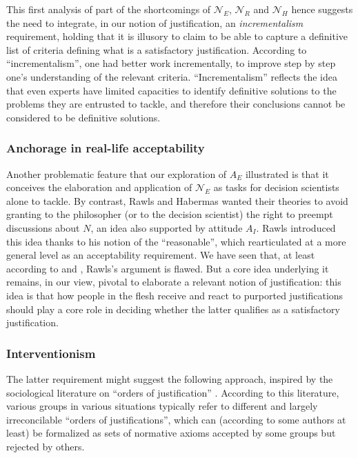 \documentclass[preprint, french, english, 11pt, authoryear]{elsarticle}%
\begin{document}
This first analysis of part of the shortcomings of $\mathscr{N}_E$, $\mathscr{N}_{R}$ and $\mathscr{N}_{H}$ hence suggests the need to integrate, in our notion of justification, an \emph{incrementalism} requirement, holding that it is illusory to claim to be able to capture a definitive list of criteria defining what is a satisfactory justification. According to “incrementalism”, one had better work incrementally, to improve step by step one's understanding of the relevant criteria. “Incrementalism” reflects the idea that even experts have limited capacities to identify definitive solutions to the problems they are entrusted to tackle, and therefore their conclusions cannot be considered to be definitive solutions.

\subsubsection{Anchorage in real-life acceptability}
Another problematic feature that our exploration of $A_E$ illustrated is that it conceives the elaboration and application of $\mathscr{N}_E$ as tasks for decision scientists alone to tackle. By contrast, Rawls and Habermas wanted their theories to avoid granting to the philosopher (or to the decision scientist) the right to preempt discussions about $N$, an idea also supported by attitude $A_I$. Rawls introduced this idea thanks to his notion of the ``reasonable'', which \cite{estlund_democratic_2009} rearticulated at a more general level as an acceptability requirement. We have seen that, at least according to \cite{habermas_reconciliation_1995} and \cite{estlund_democratic_2009}, Rawls's argument is flawed. But a core idea underlying it remains, in our view, pivotal to elaborate a relevant notion of justification: this idea is that how people in the flesh receive and react to purported justifications should play a core role in deciding whether the latter qualifies as a satisfactory justification.

\subsubsection{Interventionism}
The latter requirement might suggest the following approach, inspired by the sociological literature on “orders of justification” \citep{boltanski_justification_2006}. According to this literature, various groups in various situations typically refer to different and largely irreconcilable “orders of justifications”, which can (according to some authors at least) be formalized as sets of normative axioms accepted by some groups but rejected by others.
\end{document}
